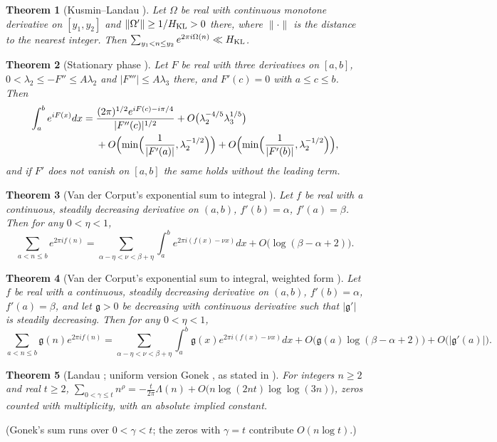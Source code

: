 \documentclass[preprint,12pt]{elsarticle}
\numberwithin{equation}{section}
\theoremstyle{plain}
\newtheorem{theorem}{Theorem}[section]
\theoremstyle{definition}
\theoremstyle{remark}
\begin{document}
\begin{theorem}[Kusmin--Landau {\cite[Thm.~2.1]{GrahamKolesnik1991}}]\label{thm:known_KL}
Let $\Omega$ be real with continuous monotone derivative on $[y_1,y_2]$ and $\|\Omega'\|\ge1/H_{\rm KL}>0$ there, where $\|\cdot\|$ is the distance to the nearest integer. Then $\sum_{y_1<n\le y_2}e^{2\pi i\Omega(n)}\ll H_{\rm KL}$.
\end{theorem}

\begin{theorem}[Stationary phase {\cite[Lemma~4.6]{Titchmarsh1986}}]\label{thm:known_stationary}
Let $F$ be real with three derivatives on $[a,b]$, $0<\lambda_2\le-F''\le A\lambda_2$ and $|F'''|\le A\lambda_3$ there, and $F'(c)=0$ with $a\le c\le b$. Then
\begin{align*}
\int_a^be^{iF(x)}dx={}&\frac{(2\pi)^{1/2}e^{iF(c)-i\pi/4}}{|F''(c)|^{1/2}}+O\bigl(\lambda_2^{-4/5}\lambda_3^{1/5}\bigr)\\
&+O\Bigl(\min\Bigl(\frac1{|F'(a)|},\lambda_2^{-1/2}\Bigr)\Bigr)+O\Bigl(\min\Bigl(\frac1{|F'(b)|},\lambda_2^{-1/2}\Bigr)\Bigr),
\end{align*}
and if $F'$ does not vanish on $[a,b]$ the same holds without the leading term.
\end{theorem}

\begin{theorem}[Van der Corput's exponential sum to integral {\cite[Lemma~4.7]{Titchmarsh1986}}]\label{thm:known_vdC}
Let $f$ be real with a continuous, steadily decreasing derivative on $(a,b)$, $f'(b)=\alpha$, $f'(a)=\beta$. Then for any $0<\eta<1$,
\[
\sum_{a<n\le b}e^{2\pi if(n)}=\sum_{\alpha-\eta<\nu<\beta+\eta}\int_a^be^{2\pi i(f(x)-\nu x)}dx+O\bigl(\log(\beta-\alpha+2)\bigr).
\]
\end{theorem}

\begin{theorem}[Van der Corput's exponential sum to integral, weighted form {\cite[Lemma~4.10]{Titchmarsh1986}}]\label{thm:known_vdC_weighted}
Let $f$ be real with a continuous, steadily decreasing derivative on $(a,b)$, $f'(b)=\alpha$, $f'(a)=\beta$, and let $\mathfrak g>0$ be decreasing with continuous derivative such that $|\mathfrak g'|$ is steadily decreasing. Then for any $0<\eta<1$,
\[
\sum_{a<n\le b}\mathfrak g(n)e^{2\pi if(n)}=\sum_{\alpha-\eta<\nu<\beta+\eta}\int_a^b\mathfrak g(x)e^{2\pi i(f(x)-\nu x)}dx+O\bigl(\mathfrak g(a)\log(\beta-\alpha+2)\bigr)+O\bigl(|\mathfrak g'(a)|\bigr).
\]
\end{theorem}

\begin{theorem}[Landau {\cite{Landau1912}}; uniform version Gonek {\cite{Gonek1993}}, as stated in {\cite[(1.1)]{Aryan2022}}]\label{thm:known_landau}
For integers $n\ge2$ and real $t\ge2$, $\sum_{0<\gamma\le t}n^{\rho}=-\frac t{2\pi}\Lambda(n)+O\bigl(n\log(2nt)\log\log(3n)\bigr)$, zeros counted with multiplicity, with an absolute implied constant.
\end{theorem}
(Gonek's sum runs over $0<\gamma<t$; the zeros with $\gamma=t$ contribute $O(n\log t)$.)
\end{document}

